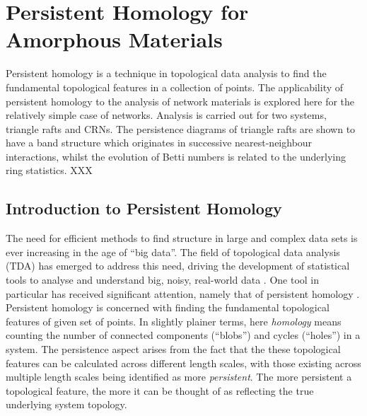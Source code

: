 \chapter[Persistent Homology for Amorphous Materials]{Persistent Homology for \\ Amorphous Materials}
\label{ch:ph}

\begin{chapterabstract}
Persistent homology is a technique in topological data analysis to find the fundamental topological features in a collection of points.
The applicability of persistent homology to the analysis of network materials is explored here for the relatively simple case of \td{} networks. 
Analysis is carried out for two systems, triangle rafts and CRNs. 
The persistence diagrams of triangle rafts are shown to have a band structure which originates in successive nearest\--neighbour interactions, whilst the evolution of Betti numbers is related to the underlying ring statistics.
XXX
\end{chapterabstract}

\section{Introduction to Persistent Homology}

The need for efficient methods to find structure in large and complex data sets is ever increasing in the age of ``big data''.
The field of topological data analysis (TDA) has emerged to address this need, driving the development of statistical tools to analyse and understand big, noisy, real\--world data \cite{Wasserman2018}.
One tool in particular has received significant attention, namely that of persistent homology \cite{Edelsbrunner2008}.
Persistent homology is concerned with finding the fundamental topological features of given set of points. 
In slightly plainer terms, here \textit{homology} means counting the number of connected components (``blobs'') and cycles (``holes'') in a system.
The persistence aspect arises from the fact that the these topological features can be calculated across different length scales, with those existing across multiple length scales being identified as more \textit{persistent}.
The more persistent a topological feature, the more it can be thought of as reflecting the true underlying system topology.

